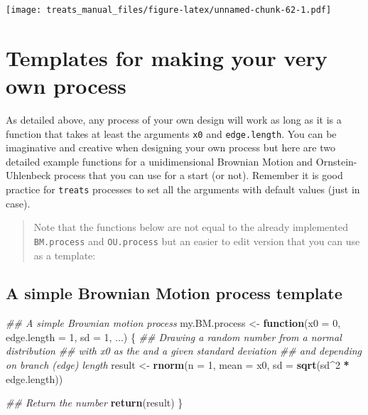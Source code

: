 \documentclass[
]{book}
\newenvironment{Shaded}{\begin{snugshade}}{\end{snugshade}}
\newcommand{\CommentTok}[1]{\textcolor[rgb]{0.56,0.35,0.01}{\textit{#1}}}
\newcommand{\ControlFlowTok}[1]{\textcolor[rgb]{0.13,0.29,0.53}{\textbf{#1}}}
\newcommand{\DataTypeTok}[1]{\textcolor[rgb]{0.13,0.29,0.53}{#1}}
\newcommand{\DecValTok}[1]{\textcolor[rgb]{0.00,0.00,0.81}{#1}}
\newcommand{\KeywordTok}[1]{\textcolor[rgb]{0.13,0.29,0.53}{\textbf{#1}}}
\newcommand{\NormalTok}[1]{#1}
\newcommand{\OperatorTok}[1]{\textcolor[rgb]{0.81,0.36,0.00}{\textbf{#1}}}
\newcommand{\StringTok}[1]{\textcolor[rgb]{0.31,0.60,0.02}{#1}}
\begin{document}
\texttt{[image: treats\_manual\_files/figure-latex/unnamed-chunk-62-1.pdf]}

\hypertarget{templates-for-making-your-very-own-process}{%
\section{Templates for making your very own process}\label{templates-for-making-your-very-own-process}}

As detailed above, any process of your own design will work as long as it is a function that takes at least the arguments \texttt{x0} and \texttt{edge.length}.
You can be imaginative and creative when designing your own process but here are two detailed example functions for a unidimensional Brownian Motion and Ornstein-Uhlenbeck process that you can use for a start (or not).
Remember it is good practice for \texttt{treats} processes to set all the arguments with default values (just in case).

\begin{quote}
Note that the functions below are not equal to the already implemented \texttt{BM.process} and \texttt{OU.process} but an easier to edit version that you can use as a template:
\end{quote}

\hypertarget{a-simple-brownian-motion-process-template}{%
\subsection{A simple Brownian Motion process template}\label{a-simple-brownian-motion-process-template}}

\begin{Shaded}
\begin{Highlighting}[]
\CommentTok{\#\# A simple Brownian motion process}
\NormalTok{my.BM.process \textless{}{-}}\StringTok{ }\ControlFlowTok{function}\NormalTok{(}\DataTypeTok{x0 =} \DecValTok{0}\NormalTok{, }\DataTypeTok{edge.length =} \DecValTok{1}\NormalTok{, }\DataTypeTok{sd =} \DecValTok{1}\NormalTok{, ...) \{}
    \CommentTok{\#\# Drawing a random number from a normal distribution}
    \CommentTok{\#\# with x0 as the and a given standard deviation}
    \CommentTok{\#\# and depending on branch (edge) length}
\NormalTok{    result \textless{}{-}}\StringTok{ }\KeywordTok{rnorm}\NormalTok{(}\DataTypeTok{n =} \DecValTok{1}\NormalTok{, }\DataTypeTok{mean =}\NormalTok{ x0, }\DataTypeTok{sd =} \KeywordTok{sqrt}\NormalTok{(sd}\OperatorTok{\^{}}\DecValTok{2} \OperatorTok{*}\StringTok{ }\NormalTok{edge.length))}

    \CommentTok{\#\# Return the number}
    \KeywordTok{return}\NormalTok{(result)}
\NormalTok{\}}
\end{Highlighting}
\end{Shaded}
\end{document}
